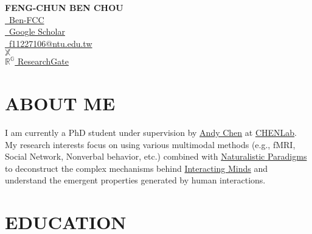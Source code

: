 \documentclass[a4paper,12pt]{article}
\newcommand{\sectionspace}{0pt} %
\begin{document}
\sloppy %

\begin{center}
    \vspace*{-50pt} %
    \textbf{{\fontsize{25}{48}\selectfont F}{\fontsize{18}{48}\selectfont ENG-}{\fontsize{25}{48}\selectfont C}{\fontsize{18}{48}\selectfont HUN }{\fontsize{25}{48}\selectfont B}{\fontsize{18}{48}\selectfont EN} {\fontsize{25}{48}\selectfont C}{\fontsize{18}{48}\selectfont HOU}} \\
    \vspace{10pt} %
    \href{https://github.com/Ben-FCC}{\color{black}\faGithub \ Ben-FCC} \\
    \href{https://scholar.google.com/citations?user=oZ5rsb0AAAAJ&hl=en}{\color{black}\faGoogle \ Google Scholar}\\
    \href{mailto:f11227106@ntu.edu.tw}{\color{black}\faEnvelope \ f11227106@ntu.edu.tw} \\
    \href{https://x.com/FengChunChou}{$\mathbb{X}$ \@FengChunChou}\\
    \href{https://www.researchgate.net/profile/Feng-Chun-Chou-2?ev=hdr_xprf}{$\mathbb{R}^{\mathbb{G}}$ ResearchGate}\\
\end{center}

\vspace{5pt}

\section*{ABOUT ME}
I am currently a PhD student under supervision by \href{https://scholar.google.com/citations?hl=en&user=wXNCX4EAAAAJ&view_op=list_works&sortby=pubdate}{Andy Chen} at \href{https://www.chenlaboratory.com/}{CHENLab}. My research interests focus on using various multimodal methods (e.g., fMRI, Social Network, Nonverbal behavior, etc.) combined with \href{https://naturalistic-data.org/content/intro.html}{Naturalistic Paradigms} to deconstruct the complex mechanisms behind \href{https://cosanlab.com/static/papers/Wheatley_2023_PISP.pdf}{Interacting Minds} and understand the emergent properties generated by human interactions.
\vspace{\sectionspace}

\section*{EDUCATION}
\end{document}
